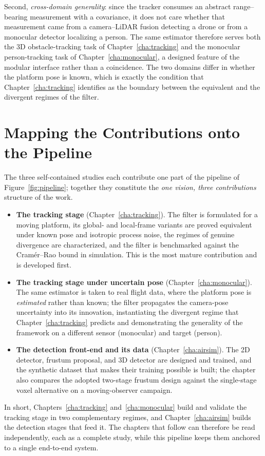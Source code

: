 Second, \emph{cross-domain generality}: since the tracker consumes an abstract
range--bearing measurement with a covariance, it does not care whether that
measurement came from a camera--LiDAR fusion detecting a drone or from a monocular
detector localizing a person. The same estimator therefore serves both the 3D
obstacle-tracking task of Chapter~\ref{cha:tracking} and the monocular
person-tracking task of Chapter~\ref{cha:monocular}, a designed feature of the
modular interface rather than a coincidence. The two domains differ in whether
the platform pose is known, which is exactly the condition that
Chapter~\ref{cha:tracking} identifies as the boundary between the equivalent and
the divergent regimes of the filter.

\section{Mapping the Contributions onto the Pipeline}
\label{sec:pipeline-mapping}

The three self-contained studies each contribute one part of
the pipeline of Figure~\ref{fig:pipeline}; together they constitute the
\emph{one vision, three contributions} structure of the work.

\begin{itemize}
  \item \textbf{The tracking stage} (Chapter~\ref{cha:tracking}). The
  filter is formulated for a moving platform, its global- and
  local-frame variants are proved equivalent under known pose and isotropic
  process noise, the regimes of genuine divergence are characterized, and the
  filter is benchmarked against the Cram\'er--Rao bound in simulation. This is the
  most mature contribution and is developed first.
  \item \textbf{The tracking stage under uncertain pose}
  (Chapter~\ref{cha:monocular}). The same estimator is taken to real flight data,
  where the platform pose is \emph{estimated} rather than known; the filter
  propagates the camera-pose uncertainty into its innovation, instantiating the
  divergent regime that Chapter~\ref{cha:tracking} predicts and demonstrating the
  generality of the framework on a different sensor (monocular) and target
  (person).
  \item \textbf{The detection front-end and its data}
  (Chapter~\ref{cha:airsim}). The 2D detector, frustum proposal, and 3D detector are
  designed and trained, and the synthetic dataset that makes their training
  possible is built; the chapter also compares the adopted two-stage frustum
  design against the single-stage voxel alternative on a moving-observer campaign.
\end{itemize}

In short, Chapters~\ref{cha:tracking} and~\ref{cha:monocular} build and validate
the tracking stage in two complementary regimes, and Chapter~\ref{cha:airsim}
builds the detection stages that feed it. The chapters that follow can therefore
be read independently, each as a complete study, while this pipeline keeps them
anchored to a single end-to-end system.
